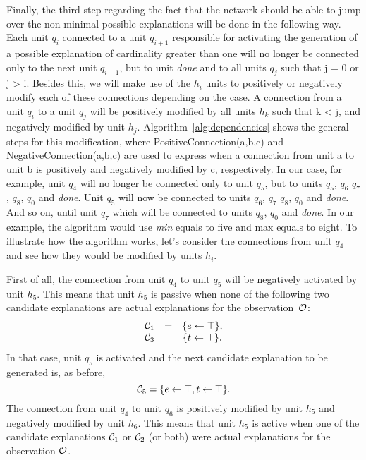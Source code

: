 Finally, the third step regarding the fact that the network should be able to jump over the non-minimal possible explanations will be done in the following way. Each unit $q_i$ connected to a unit $q_{i+1}$ responsible for activating the generation of a possible explanation of cardinality greater than one will no longer be connected only to the next unit $q_{i+1}$, but to unit \textit{done} and to all units $q_j$ such that j = 0 or j > i. Besides this, we will make use of the $h_i$ units to positively or negatively modify each of these connections depending on the case. A connection from a unit $q_i$ to a unit $q_j$ will be positively modified by all units $h_k$ such that k < j, and negatively modified by unit $h_j$. Algorithm~\ref{alg:dependencies} shows the general steps for this modification, where PositiveConnection(a,b,c) and NegativeConnection(a,b,c) are used to express when a connection from unit a to unit b is positively and negatively modified by c, respectively.
In our case, for example, unit $q_4$ will no longer be connected only to unit $q_5$, but to units $q_5$, $q_6$ $q_7$, $q_8$, $q_0$ and \textit{done}. Unit $q_5$ will now be connected to units $q_6$, $q_7$ $q_8$, $q_0$ and \textit{done}. And so on, until unit $q_7$ which will be connected to units $q_8$, $q_0$ and \textit{done}. In our example, the algorithm would use \textit{min} equals to five and max equals to eight. To illustrate how the algorithm works, let's consider the connections from unit $q_4$ and see how they would be modified by units $h_i$. 

First of all, the connection from unit $q_4$ to unit $q_5$ will be negatively activated by unit $h_5$. This means that unit $h_5$ is passive when none of the following two candidate explanations are actual explanations for the observation~$\mathcal{O}$:
\[
\begin{array}{ccc}
\mathcal{C}_1 &=& \{e \leftarrow \top\},\\
\mathcal{C}_3 &=& \{t \leftarrow \top\}.
\end{array}
\]
In that case, unit $q_5$ is activated and the next candidate explanation to be generated is, as before, 
\[
\mathcal{C}_5 = \{e \leftarrow \top, t \leftarrow \top\}.
\]
The connection from unit $q_4$ to unit $q_6$ is positively modified by unit $h_5$ and negatively modified by unit $h_6$. This means that unit $h_5$ is active when one of the candidate explanations $\mathcal{C}_1$ or $\mathcal{C}_2$ (or both) were actual explanations for the observation $\mathcal{O}$.

